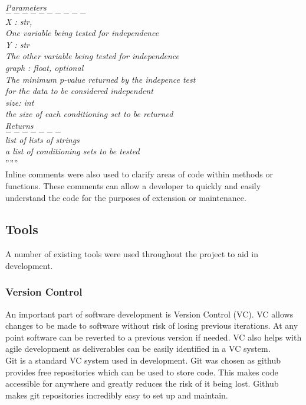 \documentclass{article}
\begin{document}
	\textit{Parameters\\
$ 	---------- $\\
	X : str, \\
	One variable being tested for independence\\ 
	Y : str\\
	The other variable being tested for independence\\
	graph : float, optional\\
	The minimum p-value returned by the indepence test\\
	for the data to be considered independent\\
	size: int\\
	the size of each conditioning set to be returned\\
	Returns\\
	$ ------- $\\
	list of lists of strings\\
	a list of conditioning sets to be tested\\}
	''''''\\


Inline comments were also used to clarify areas of code within methods or functions. These comments can allow a developer to quickly and easily understand the code for the purposes of extension or maintenance. 



\subsection{Tools}
A number of existing tools were used throughout the project to aid in development. 

\subsubsection{Version Control}
An important part of software development is Version Control (VC). VC allows changes to be made to software without risk of losing previous iterations. At any point software can be reverted to a previous version if needed. VC also helps with agile development as deliverables can be easily identified in a VC system.\\

Git is a standard VC system used in development. Git was chosen as github provides free repositories which can be used to store code. This makes code accessible for anywhere and greatly reduces the risk of it being lost. Github makes git repositories incredibly easy to set up and maintain.\\
\end{document}
